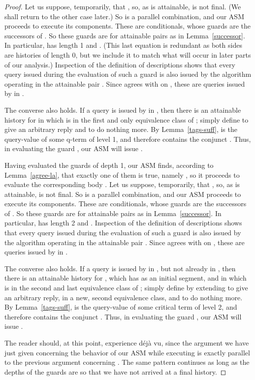 \documentclass{LMCS}
\theoremstyle{definition}
\begin{document}
\begin{proof}
Let us suppose, temporarily, that , so, as  is attainable,
 is not final.  (We shall return to the other case later.)
So  is a parallel combination, and our ASM
proceeds to execute its components.  These are conditionals, whose
guards  are the successors of .  So
these guards are  for attainable pairs  as in
Lemma~\ref{successor}.  In particular,  has length 1 and
.  (This last equation is redundant as both sides
are histories of length 0, but we include it to match what will occur
in later parts of our analysis.)  Inspection of the definition of
descriptions shows that every query issued during the evaluation of
such a guard is also issued by the algorithm  operating in the
attainable pair .  Since 
agrees with  on , these are queries issued by 
in .

The converse also holds.  If a query  is issued by  in
, then there is an attainable history  for
 in which  is in the first and only equivalence class of
; simply define  to give  an arbitrary reply
and to do nothing more.  By Lemma~\ref{tags-suff},  is the
query-value of some q-term  of level 1, and therefore
 contains the conjunct .  Thus, in evaluating
the guard , our ASM will issue .

Having evaluated the guards of depth 1, our ASM finds, according to
Lemma~\ref{agree-la}, that exactly one of them is true, namely
, so it proceeds to evaluate the corresponding
body .  Let us suppose, temporarily, that
, so, as  is attainable,  is not final.  So
 is a parallel combination, and our ASM
proceeds to execute its components.  These are conditionals, whose
guards  are the successors of .  So
these guards are  for attainable pairs  as
in Lemma~\ref{successor}.  In particular,  has length 2 and
.  Inspection of the definition of descriptions
shows that every query issued during the evaluation of such a guard is
also issued by the algorithm  operating in the attainable pair
.  Since  agrees with
 on , these are queries issued by  in
.

The converse also holds.  If a query  is issued by  in
, but not already in , then there is
an attainable history  for , which has  as an
initial segment, and in which  is in the second and
last equivalence class of ; simply define  by
extending  to give  an arbitrary reply, in a new,
second equivalence class, and to do nothing more.
By Lemma~\ref{tags-suff},  is the query-value of some critical term
 of level 2, and therefore  contains the conjunct
.  Thus, in evaluating the guard , our ASM will
issue .

The reader should, at this point, experience d\'ej\`a vu, since the
argument we have just given concerning the behavior of our ASM while
executing  is exactly parallel to the
previous argument concerning .  The same
pattern continues as long as the depths of the guards are  so that
we have not arrived at a final history.


\end{proof}
\end{document}

